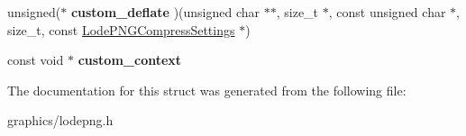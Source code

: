 \begin{DoxyCompactItemize}
\item 
\hypertarget{struct_lode_p_n_g_compress_settings_ae0d6adc268768bce7e9117f3e0f2191a}{unsigned($\ast$ {\bfseries custom\+\_\+deflate} )(unsigned char $\ast$$\ast$, size\+\_\+t $\ast$, const unsigned char $\ast$, size\+\_\+t, const \hyperlink{struct_lode_p_n_g_compress_settings}{Lode\+P\+N\+G\+Compress\+Settings} $\ast$)}\label{struct_lode_p_n_g_compress_settings_ae0d6adc268768bce7e9117f3e0f2191a}

\item 
\hypertarget{struct_lode_p_n_g_compress_settings_a62826645ef28e2a84dd2b65f547a2883}{const void $\ast$ {\bfseries custom\+\_\+context}}\label{struct_lode_p_n_g_compress_settings_a62826645ef28e2a84dd2b65f547a2883}

\end{DoxyCompactItemize}


The documentation for this struct was generated from the following file\+:\begin{DoxyCompactItemize}
\item 
graphics/lodepng.\+h\end{DoxyCompactItemize}
